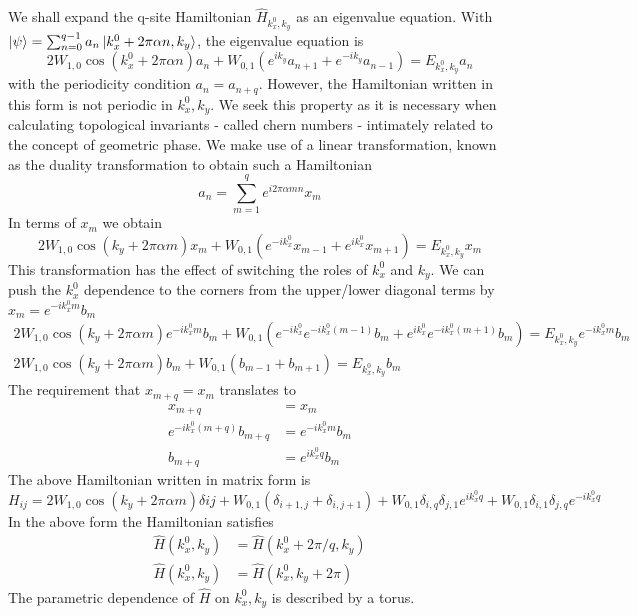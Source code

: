We shall expand the q-site Hamiltonian $\hat{H}_{k_x^0, k_y}$ as an eigenvalue equation. With $\ket{\psi} = \sum_{n=0}^{q-1}{a_n \ket{k_{x}^0 + 2\pi\alpha n, k_y}}$, the 
eigenvalue equation is
\begin{equation}
2W_{1,0} \cos(k_{x}^0 + 2\pi\alpha n) a_{n} + W_{0,1} (e^{ik_y} a_{n+1} + e^{-ik_y} a_{n-1}) = E_{k_{x}^0, k_y} a_n
\end{equation} with the periodicity condition $a_{n} = a_{n+q}$.
However, the Hamiltonian written in this form is not periodic in $k_x^0 , k_y$. We seek this property as it is necessary when calculating topological invariants - called
chern numbers - intimately related to the concept of geometric phase. We make use of a linear transformation, known as the duality transformation \cite{aubry1980analyticity} to obtain such a Hamiltonian
\begin{equation}
 a_{n} = \sum_{m=1}^{q} e^{i2\pi\alpha mn} x_{m}
\end{equation} In terms of $x_{m}$ we obtain
\begin{equation}
 2W_{1,0} \cos(k_y + 2\pi\alpha m)x_{m} + W_{0,1}(e^{-ik_{x}^0} x_{m-1} + e^{ik_{x}^0}x_{m+1}) = E_{k_{x}^0, k_y} x_{m}
\end{equation} This transformation has the effect of switching the roles of $k_{x}^0$ and $k_{y}$.
We can push the $k_{x}^0$ dependence to the corners from the upper/lower diagonal terms by $x_m = e^{-ik_{x}^0 m} b_{m}$
\begin{gather}
 2W_{1,0} \cos(k_y + 2\pi\alpha m)e^{-ik_{x}^0 m} b_{m} + W_{0,1}(e^{-ik_{x}^0} e^{-ik_{x}^0 (m-1)} b_{m} + e^{ik_{x}^0}e^{-ik_{x}^0 (m+1)} b_{m}) = E_{k_{x}^0, k_y} e^{-ik_{x}^0 m} b_{m} \nonumber \\
 2W_{1,0} \cos(k_y + 2\pi\alpha m)b_{m} + W_{0,1}(b_{m-1} + b_{m+1}) = E_{k_{x}^0, k_y} b_{m}
\end{gather}
The requirement that $x_{m+q} = x_{m}$ translates to
\begin{align}
 x_{m+q} &= x_{m} \nonumber \\
 e^{-ik_{x}^0 (m+q)} b_{m+q} &= e^{-ik_{x}^0 m} b_{m} \nonumber \\
 b_{m+q} &= e^{ik_{x}^0 q} b_{m}
\end{align}
The above Hamiltonian written in matrix form is
\begin{equation}
H_{ij} = 2W_{1,0} \cos(k_y + 2\pi\alpha m) \delta{ij} + W_{0,1} (\delta_{i+1, j} + \delta_{i, j+1}) + W_{0,1}\delta_{i,q}\delta_{j,1} e^{ik_{x}^0 q} + W_{0,1}\delta_{i,1}\delta_{j,q} e^{-ik_{x}^0 q}
\end{equation}
In the above form the Hamiltonian satisfies
\begin{align}
 \hat{H}(k_{x}^0, k_y) &= \hat{H}(k_{x}^0 + 2\pi/q, k_y) \\
 \hat{H}(k_{x}^0, k_y) &= \hat{H}(k_{x}^0, k_y+2\pi)
\end{align} The parametric dependence of $\hat{H}$ on $k_x^0 , k_y$ is described by a torus.

